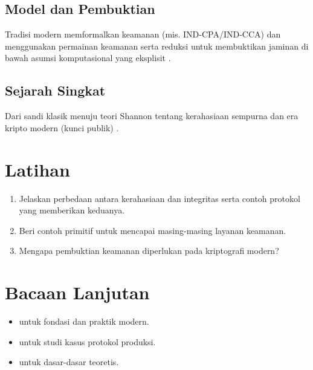 \documentclass[../main.tex]{subfiles}
\begin{document}
\subsection{Model dan Pembuktian}
Tradisi modern memformalkan keamanan (mis. IND-CPA/IND-CCA) dan menggunakan permainan keamanan serta reduksi untuk membuktikan jaminan di bawah asumsi komputasional yang eksplisit \citep{bonehshoup}.

\subsection{Sejarah Singkat}
Dari sandi klasik menuju teori Shannon tentang kerahasiaan sempurna dan era kripto modern (kunci publik) \citep{shannon1949,diffiehellman1976,rsa1978}.

\section{Latihan}
\begin{enumerate}
  \item Jelaskan perbedaan antara kerahasiaan dan integritas serta contoh protokol yang memberikan keduanya.
  \item Beri contoh primitif untuk mencapai masing-masing layanan keamanan.
  \item Mengapa pembuktian keamanan diperlukan pada kriptografi modern?
\end{enumerate}

\section{Bacaan Lanjutan}
\begin{itemize}
  \item \citep{bonehshoup} untuk fondasi dan praktik modern.
  \item \citep{rfc8446} untuk studi kasus protokol produksi.
  \item \citep{shannon1949} untuk dasar-dasar teoretis.
\end{itemize}
\end{document}
